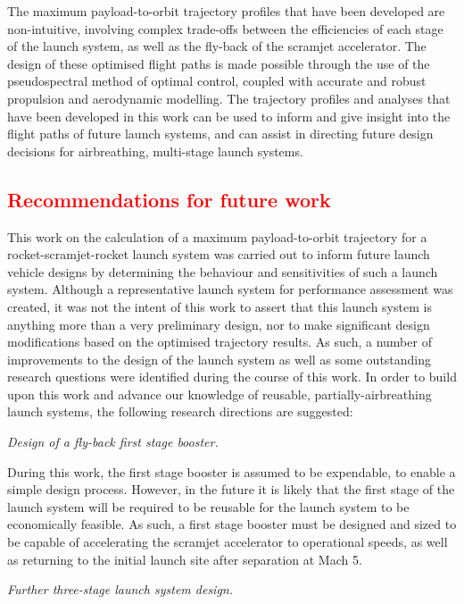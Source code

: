 The maximum payload-to-orbit trajectory profiles that have been developed are non-intuitive, involving complex trade-offs between the efficiencies of each stage of the launch system, as well as the fly-back of the scramjet accelerator. The design of these optimised flight paths is made possible through the use of the pseudospectral method of optimal control, coupled with accurate and robust propulsion and aerodynamic modelling.  
The trajectory profiles and analyses that have been developed in this work can be used to inform and give insight into the flight paths of future launch systems, and can assist in directing future design decisions for airbreathing, multi-stage launch systems. 

\textcolor{red}{
  \chapter{Recommendations for future work}
}
  	
 This work on the calculation of a maximum payload-to-orbit trajectory for a rocket-scramjet-rocket launch system was carried out to inform future launch vehicle designs by determining the behaviour and sensitivities of such a launch system. 
  Although a representative launch system for performance assessment was created, it was not the intent of this work to assert that this launch system is anything more than a very preliminary design, nor to make significant design modifications based on the optimised trajectory results.
 As such, a number of improvements to the design of the launch system as well as some outstanding research questions were identified during the course of this work.
 In order to build upon this work and advance our knowledge of reusable, partially-airbreathing launch systems, the following research directions are suggested:


\vspace{10pt}
 \textit{Design of a fly-back first stage booster.}
 
 \noindent
 During this work, the first stage booster is assumed to be expendable, to enable a simple design process. However, in the future it is likely that the first stage of the launch system will be required to be reusable for the launch system to be economically feasible. As such, a first stage booster must be designed and sized to be capable of accelerating the scramjet accelerator to operational speeds, as well as returning to the initial launch site after separation at Mach 5. 

\vspace{10pt}
	\textit{Further three-stage launch system design.}


